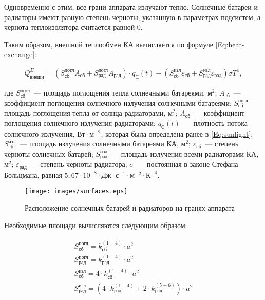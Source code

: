 \documentclass[12pt,a4paper]{article}
\begin{document}
Одновременно с этим, все грани аппарата излучают тепло. Солнечные батареи и радиаторы
имеют разную степень черноты, указанную в параметрах подсистем, а чернота теплоизолятора
считается равной 0.

Таким образом, внешний теплообмен КА вычисляется по формуле \ref{Eq:heat-exchange}:

\begin{eqnarray}
  Q^{\Sigma}_{\text{внешн}} = \left(S_{\text{сб}}^{\text{погл}} A_{\text{сб}} +
  S_{\text{рад}}^{\text{погл}} A_{\text{рад}}\right) \cdot q_{\text{С}}(t) -
  \left(S_{\text{сб}}^{\text{изл}} \varepsilon_{\text{сб}} + S_{\text{рад}}^{\text{изл}}
  \varepsilon_{\text{рад}}\right)
  \sigma T^4, \label{Eq:heat-exchange}
\end{eqnarray}

где $S_{\text{сб}}^{\text{погл}}$~--- площадь поглощения тепла солнечными батареями,
$\text{м}^2$; $A_{\text{сб}}$~--– коэффициент поглощения солнечного излучения солнечными
батареями; $S_{\text{сб}}^{\text{погл}}$~--– площадь поглощения тепла от солнца
радиаторами, $\text{м}^2$; $A_{\text{сб}}$~--– коэффициент поглощения солнечного излучения
радиаторами; $q_{\text{С}}(t)$~--– плотность потока солнечного излучения, $\text{Вт} \cdot
\text{м}^{-2}$, которая была определена ранее в \ref{Eq:sunlight};
$S_{\text{сб}}^{\text{изл}}$~--- площадь излучения солнечными батареями КА, $\text{м}^2$; $\varepsilon_{\text{сб}}$~--–
степень черноты солнечных батарей; $S_{\text{рад}}^{\text{изл}}$~--– площадь излучения
всеми радиаторами КА, $\text{м}^2$; $\varepsilon_{\text{рад}}$~--– степень черноты радиатора; $\sigma$~--- постоянная в законе
Стефана-Больцмана, равная $5,67 \cdot 10^{-8} \cdot \text{Дж} \cdot \text{с}^{-1} \cdot
\text{м}^{-2} \cdot \text{К}^{-4}$.

\begin{figure}[tbh]
  \begin{center}
    \texttt{[image: images/surfaces.eps]}
    \caption{Расположение солнечных батарей и радиаторов на гранях аппарата}
    \label{Pic:surfaces}
  \end{center}
\end{figure}

Необходимые площади вычисляются следующим образом:

\begin{eqnarray}
  \begin{array}{l}
  S_{\text{сб}}^{\text{погл}} = k^{(1-4)}_{\text{сб}} \cdot a^2 \\
  S_{\text{рад}}^{\text{погл}} = k^{(1-4)}_{\text{рад}} \cdot a^2 \\
  S_{\text{сб}}^{\text{изл}} = 4 \cdot k^{(1-4)}_{\text{сб}} \cdot a^2 \\
  S_{\text{рад}}^{\text{изл}} = (4 \cdot k^{(1-4)}_{\text{рад}} + 2 \cdot
  k^{(5-6)}_{\text{рад}}) \cdot a^2
  \end{array}
\end{eqnarray}
\end{document}
